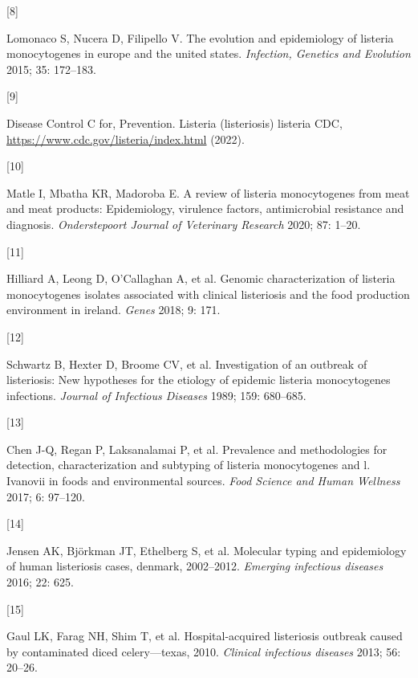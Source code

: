 \documentclass[
  10pt,
]{article}
\newlength{\cslhangindent}
\newlength{\csllabelwidth}
\newlength{\cslentryspacingunit} %
\newenvironment{CSLReferences}[2] %
 {%
  \setlength{\parindent}{0pt}
  \ifodd #1
  \let\oldpar\par
  \def\par{\hangindent=\cslhangindent\oldpar}
  \fi
  \setlength{\parskip}{#2\cslentryspacingunit}
 }%
 {}
\newcommand{\CSLLeftMargin}[1]{\parbox[t]{\csllabelwidth}{#1}}
\newcommand{\CSLRightInline}[1]{\parbox[t]{\linewidth - \csllabelwidth}{#1}\break}
\begin{document}
\begin{CSLReferences}{0}{0}
\leavevmode{}%
\CSLLeftMargin{{[}8{]} }%
\CSLRightInline{Lomonaco S, Nucera D, Filipello V. The evolution and epidemiology of listeria monocytogenes in europe and the united states. \emph{Infection, Genetics and Evolution} 2015; 35: 172--183.}

\leavevmode{}%
\CSLLeftMargin{{[}9{]} }%
\CSLRightInline{Disease Control C for, Prevention. Listeria (listeriosis) \textbar{} listeria \textbar{} CDC, \url{https://www.cdc.gov/listeria/index.html} (2022).}

\leavevmode{}%
\CSLLeftMargin{{[}10{]} }%
\CSLRightInline{Matle I, Mbatha KR, Madoroba E. A review of listeria monocytogenes from meat and meat products: Epidemiology, virulence factors, antimicrobial resistance and diagnosis. \emph{Onderstepoort Journal of Veterinary Research} 2020; 87: 1--20.}

\leavevmode{}%
\CSLLeftMargin{{[}11{]} }%
\CSLRightInline{Hilliard A, Leong D, O'Callaghan A, et al. Genomic characterization of listeria monocytogenes isolates associated with clinical listeriosis and the food production environment in ireland. \emph{Genes} 2018; 9: 171.}

\leavevmode{}%
\CSLLeftMargin{{[}12{]} }%
\CSLRightInline{Schwartz B, Hexter D, Broome CV, et al. Investigation of an outbreak of listeriosis: New hypotheses for the etiology of epidemic listeria monocytogenes infections. \emph{Journal of Infectious Diseases} 1989; 159: 680--685.}

\leavevmode{}%
\CSLLeftMargin{{[}13{]} }%
\CSLRightInline{Chen J-Q, Regan P, Laksanalamai P, et al. Prevalence and methodologies for detection, characterization and subtyping of listeria monocytogenes and l. Ivanovii in foods and environmental sources. \emph{Food Science and Human Wellness} 2017; 6: 97--120.}

\leavevmode{}%
\CSLLeftMargin{{[}14{]} }%
\CSLRightInline{Jensen AK, Björkman JT, Ethelberg S, et al. Molecular typing and epidemiology of human listeriosis cases, denmark, 2002--2012. \emph{Emerging infectious diseases} 2016; 22: 625.}

\leavevmode{}%
\CSLLeftMargin{{[}15{]} }%
\CSLRightInline{Gaul LK, Farag NH, Shim T, et al. Hospital-acquired listeriosis outbreak caused by contaminated diced celery---texas, 2010. \emph{Clinical infectious diseases} 2013; 56: 20--26.}


\end{CSLReferences}
\end{document}
